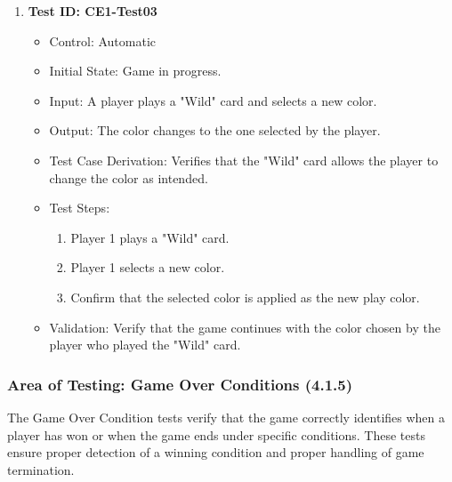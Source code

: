 \documentclass[12pt, titlepage]{article}
\begin{document}
\begin{enumerate}
    \item \textbf{Test ID: CE1-Test03}
        \begin{itemize}
            \item Control: Automatic
            \item Initial State: Game in progress.
            \item Input: A player plays a "Wild" card and selects a new color.
            \item Output: The color changes to the one selected by the player.
            \item Test Case Derivation: Verifies that the "Wild" card allows the player to change the color as intended.
            \item Test Steps:
                \begin{enumerate}
                    \item Player 1 plays a "Wild" card.
                    \item Player 1 selects a new color.
                    \item Confirm that the selected color is applied as the new play color.
                \end{enumerate}
            \item Validation: Verify that the game continues with the color chosen by the player who played the "Wild" card.
        \end{itemize}
\end{enumerate}

\subsubsection{Area of Testing: Game Over Conditions (4.1.5)}

The Game Over Condition tests verify that the game correctly identifies when a player has won or when the game ends under specific conditions. These tests ensure proper detection of a winning condition and proper handling of game termination.
\end{document}
